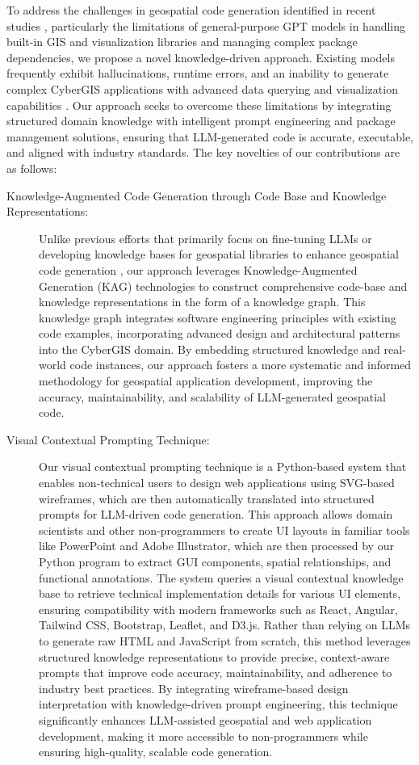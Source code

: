 To address the challenges in geospatial code generation identified in recent studies \citep{hou2024can, hou2024geocode}, particularly the limitations of general-purpose GPT models in handling built-in GIS and visualization libraries and managing complex package dependencies, we propose a novel knowledge-driven approach. Existing models frequently exhibit hallucinations, runtime errors, and an inability to generate complex CyberGIS applications with advanced data querying and visualization capabilities \citep{hou2024can}. Our approach seeks to overcome these limitations by integrating structured domain knowledge with intelligent prompt engineering and package management solutions, ensuring that LLM-generated code is accurate, executable, and aligned with industry standards. The key novelties of our contributions are as follows:
\begin{description}
    \item[Knowledge-Augmented Code Generation through Code Base and Knowledge Representations: ] Unlike previous efforts that primarily focus on fine-tuning LLMs or developing knowledge bases for geospatial libraries to enhance geospatial code generation \citep{hou2024can, hou2024gee}, our approach leverages Knowledge-Augmented Generation (KAG) technologies to construct comprehensive code-base and knowledge representations in the form of a knowledge graph. This knowledge graph integrates software engineering principles with existing code examples, incorporating advanced design and architectural patterns into the CyberGIS domain. By embedding structured knowledge and real-world code instances, our approach fosters a more systematic and informed methodology for geospatial application development, improving the accuracy, maintainability, and scalability of LLM-generated geospatial code.
    \item[Visual Contextual Prompting Technique: ] Our visual contextual prompting technique is a Python-based system that enables non-technical users to design web applications using SVG-based wireframes, which are then automatically translated into structured prompts for LLM-driven code generation. This approach allows domain scientists and other non-programmers to create UI layouts in familiar tools like PowerPoint and Adobe Illustrator, which are then processed by our Python program to extract GUI components, spatial relationships, and functional annotations.
    The system queries a visual contextual knowledge base to retrieve technical implementation details for various UI elements, ensuring compatibility with modern frameworks such as React, Angular, Tailwind CSS, Bootstrap, Leaflet, and D3.js. Rather than relying on LLMs to generate raw HTML and JavaScript from scratch, this method leverages structured knowledge representations to provide precise, context-aware prompts that improve code accuracy, maintainability, and adherence to industry best practices. By integrating wireframe-based design interpretation with knowledge-driven prompt engineering, this technique significantly enhances LLM-assisted geospatial and web application development, making it more accessible to non-programmers while ensuring high-quality, scalable code generation.
    

\end{description}
